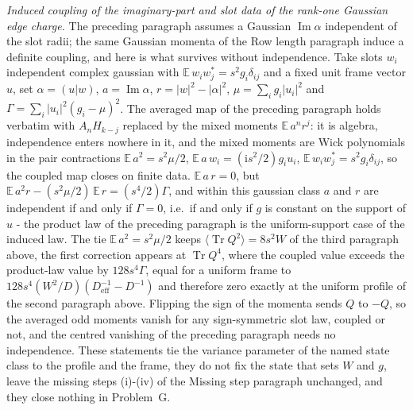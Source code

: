 \emph{Induced coupling of the imaginary-part and slot data of the rank-one Gaussian edge charge.} The preceding paragraph assumes a Gaussian \(\operatorname{Im}\alpha\) independent of the slot radii; the same Gaussian momenta of the Row length paragraph induce a definite coupling, and here is what survives without independence. Take slots \(w_{i}\) independent complex gaussian with \(\mathbb{E}\,w_{i}w_{j}^{*}=s^{2}g_{i}\delta_{ij}\) and a fixed unit frame vector \(u\), set \(\alpha=(u|w)\), \(a=\operatorname{Im}\alpha\), \(r=|w|^{2}-|\alpha|^{2}\), \(\mu=\sum_{i}g_{i}|u_{i}|^{2}\) and \(\Gamma=\sum_{i}|u_{i}|^{2}(g_{i}-\mu)^{2}\). The averaged map of the preceding paragraph holds verbatim with \(A_{n}H_{k-j}\) replaced by the mixed moments \(\mathbb{E}\,a^{n}r^{j}\): it is algebra, independence enters nowhere in it, and the mixed moments are Wick polynomials in the pair contractions \(\mathbb{E}\,a^{2}=s^{2}\mu/2\), \(\mathbb{E}\,a\,w_{i}=(\mathrm{i}s^{2}/2)g_{i}u_{i}\), \(\mathbb{E}\,w_{i}w_{j}^{*}=s^{2}g_{i}\delta_{ij}\), so the coupled map closes on finite data. \(\mathbb{E}\,a\,r=0\), but \(\mathbb{E}\,a^{2}r-(s^{2}\mu/2)\,\mathbb{E}\,r=(s^{4}/2)\Gamma\), and within this gaussian class \(a\) and \(r\) are independent if and only if \(\Gamma=0\), i.e.\ if and only if \(g\) is constant on the support of \(u\) - the product law of the preceding paragraph is the uniform-support case of the induced law. The tie \(\mathbb{E}\,a^{2}=s^{2}\mu/2\) keeps \(\langle\operatorname{Tr}Q^{2}\rangle=8s^{2}W\) of the third paragraph above, the first correction appears at \(\operatorname{Tr}Q^{4}\), where the coupled value exceeds the product-law value by \(128s^{4}\Gamma\), equal for a uniform frame to \(128s^{4}(W^{2}/D)(D_{\mathrm{eff}}^{-1}-D^{-1})\) and therefore zero exactly at the uniform profile of the second paragraph above. Flipping the sign of the momenta sends \(Q\) to \(-Q\), so the averaged odd moments vanish for any sign-symmetric slot law, coupled or not, and the centred vanishing of the preceding paragraph needs no independence. These statements tie the variance parameter of the named state class to the profile and the frame, they do not fix the state that sets \(W\) and \(g\), leave the missing steps (i)-(iv) of the Missing step paragraph unchanged, and they close nothing in Problem~G.


